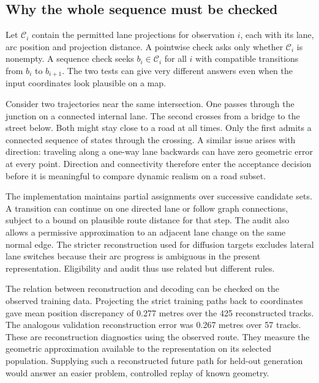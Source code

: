 \subsection{Why the whole sequence must be checked}
Let $\mathcal C_i$ contain the permitted lane projections for observation $i$, each with its lane, arc position and projection distance. A pointwise check asks only whether $\mathcal C_i$ is nonempty. A sequence check seeks $b_i\in\mathcal C_i$ for all $i$ with compatible transitions from $b_i$ to $b_{i+1}$. The two tests can give very different answers even when the input coordinates look plausible on a map.

Consider two trajectories near the same intersection. One passes through the junction on a connected internal lane. The second crosses from a bridge to the street below. Both might stay close to a road at all times. Only the first admits a connected sequence of states through the crossing. A similar issue arises with direction: traveling along a one-way lane backwards can have zero geometric error at every point. Direction and connectivity therefore enter the acceptance decision before it is meaningful to compare dynamic realism on a road subset.

The implementation maintains partial assignments over successive candidate sets. A transition can continue on one directed lane or follow graph connections, subject to a bound on plausible route distance for that step. The audit also allows a permissive approximation to an adjacent lane change on the same normal edge. The stricter reconstruction used for diffusion targets excludes lateral lane switches because their arc progress is ambiguous in the present representation. Eligibility and audit thus use related but different rules.

The relation between reconstruction and decoding can be checked on the observed training data. Projecting the strict training paths back to coordinates gave mean position discrepancy of 0.277 metres over the 425 reconstructed tracks. The analogous validation reconstruction error was 0.267 metres over 57 tracks. These are reconstruction diagnostics using the observed route. They measure the geometric approximation available to the representation on its selected population. Supplying such a reconstructed future path for held-out generation would answer an easier problem, controlled replay of known geometry.
